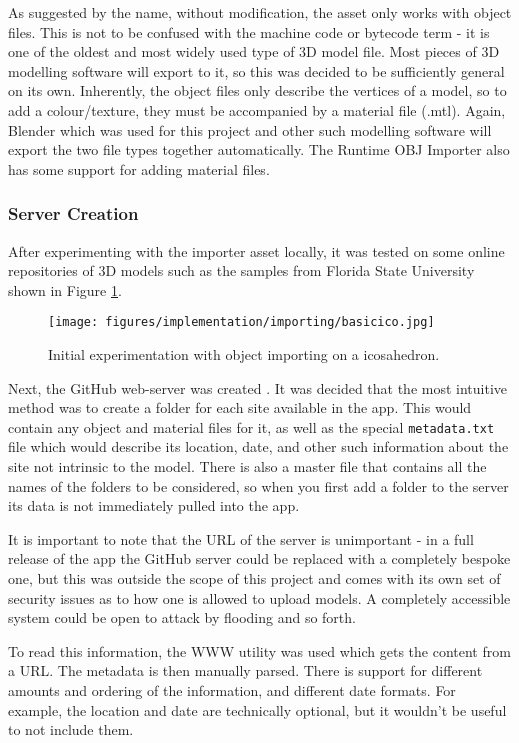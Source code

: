 \documentclass{article}
\begin{document}
As suggested by the name, without modification, the asset only works with object files. This is not to be confused with the machine code or bytecode term - it is one of the oldest and most widely used type of 3D model file. Most pieces of 3D modelling software will export to it, so this was decided to be sufficiently general on its own. Inherently, the object files only describe the vertices of a model, so to add a colour/texture, they must be accompanied by a material file (.mtl). Again, Blender which was used for this project and other such modelling software will export the two file types together automatically. The Runtime OBJ Importer also has some support for adding material files.

\subsubsection{Server Creation}
After experimenting with the importer asset locally, it was tested on some online repositories of 3D models such as the samples from Florida State University \cite{models:samplemodels} shown in Figure \ref{fig:basicico}. 

\begin{figure}[]
    \centering
    \texttt{[image: figures/implementation/importing/basicico.jpg]}
        \caption{Initial experimentation with object importing on a icosahedron.}
        \label{fig:basicico}
\end{figure}

Next, the GitHub web-server was created \cite{tools:repo}. It was decided that the most intuitive method was to create a folder for each site available in the app. This would contain any object and material files for it, as well as the special \verb|metadata.txt| file which would describe its location, date, and other such information about the site not intrinsic to the model. There is also a master file that contains all the names of the folders to be considered, so when you first add a folder to the server its data is not immediately pulled into the app. 

It is important to note that the URL of the server is unimportant - in a full release of the app the GitHub server could be replaced with a completely bespoke one, but this was outside the scope of this project and comes with its own set of security issues as to how one is allowed to upload models. A completely accessible system could be open to attack by flooding and so forth.

To read this information, the WWW utility \cite{models:www} was used which gets the content from a URL. The metadata is then manually parsed. There is support for different amounts and ordering of the information, and different date formats. For example, the location and date are technically optional, but it wouldn't be useful to not include them. 
\end{document}
